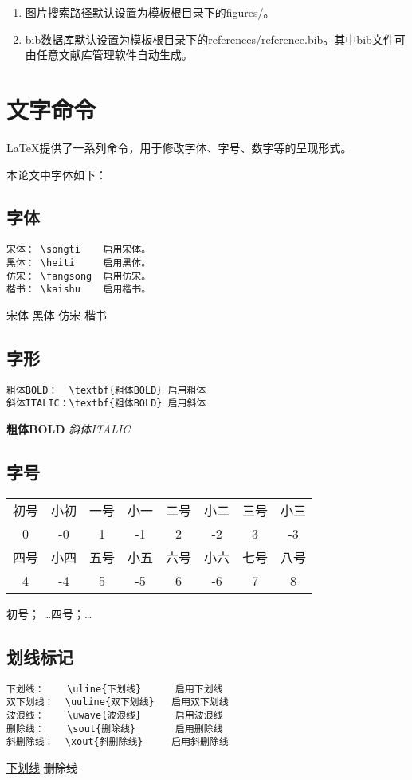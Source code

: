 \begin{enumerate}[label=(\arabic*)]
    \item 图片搜索路径默认设置为模板根目录下的figures/。
    \item bib数据库默认设置为模板根目录下的references/reference.bib。其中bib文件可由任意文献库管理软件自动生成。
\end{enumerate}

\section{文字命令}
\LaTeX 提供了一系列命令，用于修改字体、字号、数字等的呈现形式。

本论文中字体如下：
\subsection{字体}
\begin{verbatim}
宋体： \songti    启用宋体。
黑体： \heiti     启用黑体。
仿宋： \fangsong  启用仿宋。
楷书： \kaishu    启用楷书。
\end{verbatim}
{\songti 宋体} {\heiti 黑体}    {\fangsong 仿宋}     {\kaishu 楷书}

\subsection{字形}
\begin{verbatim}
粗体BOLD：  \textbf{粗体BOLD} 启用粗体
斜体ITALIC：\textbf{粗体BOLD} 启用斜体
\end{verbatim}
{\textbf{粗体BOLD}} {\textit{斜体ITALIC}}

\subsection{字号}%
\begin{center}
	\begin{tabular}{cccccccc}
		\toprule
		初号 & 小初 & 一号 & 小一 & 二号 & 小二 & 三号 & 小三 \\
		0 & -0 & 1 & -1 & 2 & -2 & 3 & -3 \\
		\hline
		四号 & 小四 & 五号 & 小五 & 六号 & 小六 & 七号 & 八号 \\
		4 & -4 & 5 & -5 & 6 & -6 & 7 & 8 \\
		\bottomrule
	\end{tabular}
\end{center}
{初号}； \dots {四号}；\dots {}

\subsection{划线标记}
\begin{verbatim}
下划线：    \uline{下划线}      启用下划线
双下划线：  \uuline{双下划线}   启用双下划线
波浪线：    \uwave{波浪线}      启用波浪线
删除线：    \sout{删除线}       启用删除线
斜删除线：  \xout{斜删除线}     启用斜删除线
\end{verbatim}
{\uline{下划线}} {} {} {\sout{删除线}} {}

\clearpage
